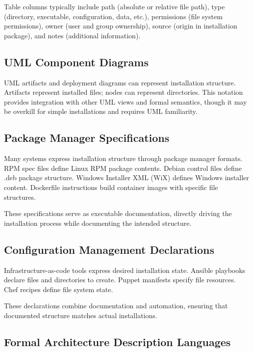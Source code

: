 \documentclass[11pt]{article}
\begin{document}
Table columns typically include path (absolute or relative file path), type (directory, executable, configuration, data, etc.), permissions (file system permissions), owner (user and group ownership), source (origin in installation package), and notes (additional information).

\subsection{UML Component Diagrams}

UML artifacts and deployment diagrams can represent installation structure. Artifacts represent installed files; nodes can represent directories. This notation provides integration with other UML views and formal semantics, though it may be overkill for simple installations and requires UML familiarity.

\subsection{Package Manager Specifications}

Many systems express installation structure through package manager formats. RPM spec files define Linux RPM package contents. Debian control files define .deb package structure. Windows Installer XML (WiX) defines Windows installer content. Dockerfile instructions build container images with specific file structures.

These specifications serve as executable documentation, directly driving the installation process while documenting the intended structure.

\subsection{Configuration Management Declarations}

Infrastructure-as-code tools express desired installation state. Ansible playbooks declare files and directories to create. Puppet manifests specify file resources. Chef recipes define file system state.

These declarations combine documentation and automation, ensuring that documented structure matches actual installations.

\subsection{Formal Architecture Description Languages}
\end{document}
